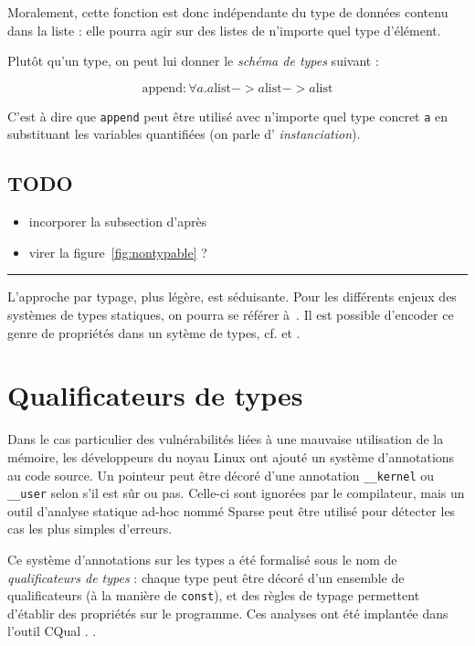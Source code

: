 Moralement, cette fonction est donc indépendante du type de données contenu dans
la liste : elle pourra agir sur des listes de n'importe quel type d'élément.

Plutôt qu'un type, on peut lui donner le \emph{schéma de types} suivant :

\[
  \textrm{append} : \forall a . a \textrm{list}
                             -> a \textrm{list}
                             -> a \textrm{list}
\]

C'est à dire que \texttt{append} peut être utilisé avec n'importe quel type
concret \texttt{a} en substituant les variables quantifiées (on parle d'
\emph{instanciation}).

\subsection*{TODO}

\begin{itemize}
\item
  incorporer la subsection d'après
\item
  virer la figure~\ref{fig:nontypable} ?
\end{itemize}

\begin{center}\rule{3in}{0.4pt}\end{center}

L'approche par typage, plus légère, est séduisante. Pour les différents enjeux
des systèmes de types statiques, on pourra se référer à~\cite{TAPL}. Il est
possible d'encoder ce genre de propriétés dans un sytème de types, cf.
\cite{lightweight-static-capabilities} et \cite{LZ06a}.

\section{Qualificateurs de types}

Dans le cas particulier des vulnérabilités liées à une mauvaise utilisation de
la mémoire, les développeurs du noyau Linux ont ajouté un système d'annotations
au code source. Un pointeur peut être décoré d'une annotation
\texttt{\_\_kernel} ou \texttt{\_\_user} selon s'il est sûr ou pas. Celle-ci
sont ignorées par le compilateur, mais un outil d'analyse statique ad-hoc nommé
Sparse  peut être utilisé pour détecter les cas les plus simples
d'erreurs.

Ce système d'annotations sur les types a été formalisé sous le nom de
\emph{qualificateurs de types} : chaque type peut être décoré d'un ensemble de
qualificateurs (à la manière de \texttt{const}), et des règles de typage
permettent d'établir des propriétés sur le programme. Ces analyses ont été
implantée dans l'outil CQual
\cite{pldi99,usenix01,pldi02,cquk-usenix04,toplas-quals}. .

